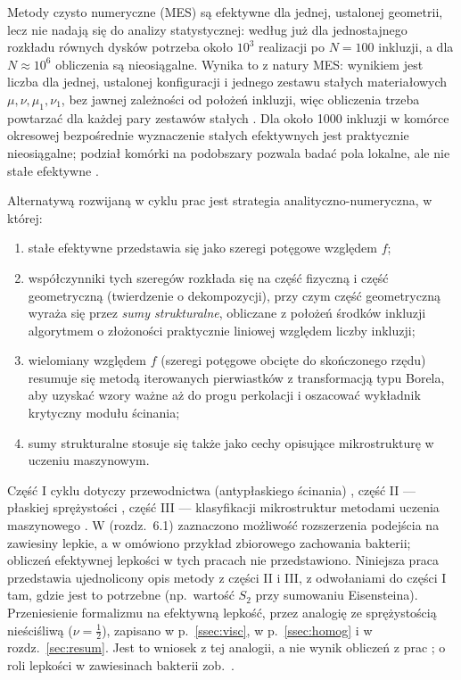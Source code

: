 \documentclass[12pt,a4paper,twoside,openright]{report}
\theoremstyle{definition}
\theoremstyle{remark}
\begin{document}
Metody czysto numeryczne (MES) są efektywne dla jednej, ustalonej geometrii, lecz nie nadają się do analizy statystycznej: według \cite{czapla2025computational} już dla jednostajnego rozkładu równych dysków potrzeba około $10^3$ realizacji po $N=100$ inkluzji, a dla $N\approx10^6$ obliczenia są nieosiągalne. Wynika to z natury MES: wynikiem jest liczba dla jednej, ustalonej konfiguracji i jednego zestawu stałych materiałowych $\mu,\nu,\mu_1,\nu_1$, bez jawnej zależności od położeń inkluzji, więc obliczenia trzeba powtarzać dla każdej pary zestawów stałych \cite{czapla2025computational}. Dla około 1000 inkluzji w komórce okresowej bezpośrednie wyznaczenie stałych efektywnych jest praktycznie nieosiągalne; podział komórki na podobszary pozwala badać pola lokalne, ale nie stałe efektywne \cite{mityushev2025computationalpart3}.

Alternatywą rozwijaną w cyklu prac \cite{mityushev2025computational,czapla2025computational,mityushev2025computationalpart3} jest strategia analityczno-numeryczna, w której:
\begin{enumerate}[label=(\roman*),nosep]
\item stałe efektywne przedstawia się jako szeregi potęgowe względem $f$;
\item współczynniki tych szeregów rozkłada się na część fizyczną i część geometryczną (twierdzenie o dekompozycji), przy czym część geometryczną wyraża się przez \emph{sumy strukturalne}, obliczane z położeń środków inkluzji algorytmem o złożoności praktycznie liniowej względem liczby inkluzji;
\item wielomiany względem $f$ (szeregi potęgowe obcięte do skończonego rzędu) resumuje się metodą iterowanych pierwiastków z transformacją typu Borela, aby uzyskać wzory ważne aż do progu perkolacji i oszacować wykładnik krytyczny modułu ścinania;
\item sumy strukturalne stosuje się także jako cechy opisujące mikrostrukturę w uczeniu maszynowym.
\end{enumerate}
Część I cyklu dotyczy przewodnictwa (antypłaskiego ścinania) \cite{mityushev2025computational}, część II --- płaskiej sprężystości \cite{czapla2025computational}, część III --- klasyfikacji mikrostruktur metodami uczenia maszynowego \cite{mityushev2025computationalpart3}. W \cite{czapla2025computational} (rozdz.~6.1) zaznaczono możliwość rozszerzenia podejścia na zawiesiny lepkie, a w \cite{mityushev2025computationalpart3} omówiono przykład zbiorowego zachowania bakterii; obliczeń efektywnej lepkości w tych pracach nie przedstawiono. Niniejsza praca przedstawia ujednolicony opis metody z części II i III, z odwołaniami do części I tam, gdzie jest to potrzebne (np.\ wartość $S_2$ przy sumowaniu Eisensteina). Przeniesienie formalizmu na efektywną lepkość, przez analogię ze sprężystością nieściśliwą ($\nu=\tfrac12$), zapisano w p.~\ref{ssec:visc}, w p.~\ref{ssec:homog} i w rozdz.~\ref{sec:resum}. Jest to wniosek z tej analogii, a nie wynik obliczeń z prac \cite{mityushev2025computational,czapla2025computational,mityushev2025computationalpart3}; o roli lepkości w zawiesinach bakterii zob.\ \cite{aranson2022bacterial}.
\end{document}
